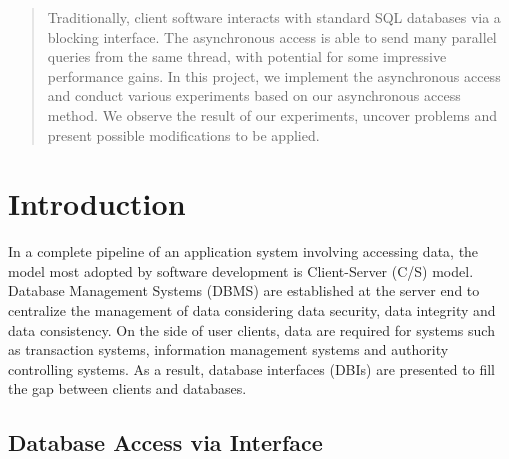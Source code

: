 \documentclass[onecolumn, conference, 12pt]{IEEEtran}
\begin{document}
	
	
	
	
	
	\maketitle
	
	\begin{abstract}
		Traditionally, client software interacts with standard SQL databases via a blocking interface. The asynchronous access is able to send many parallel queries from the same thread, with potential for some impressive performance gains. In this project, we implement the asynchronous access and conduct various experiments based on our asynchronous access method. We observe the result of our experiments, uncover problems and present possible modifications to be applied.
	\end{abstract}
	
	
	
	
	
	\IEEEpeerreviewmaketitle
	
	
	
	\section{Introduction}
	In a complete pipeline of an application system involving accessing data, the model most adopted by software development is Client-Server (C/S) model. Database Management Systems (DBMS) are established at the server end to centralize the management of data considering data security, data integrity and data consistency. On the side of user clients, data are required for systems such as transaction systems, information management systems and authority controlling systems. As a result, database interfaces (DBIs) are presented to fill the gap between clients and databases.
	
	
	
	\subsection{Database Access via Interface}
\end{document}
